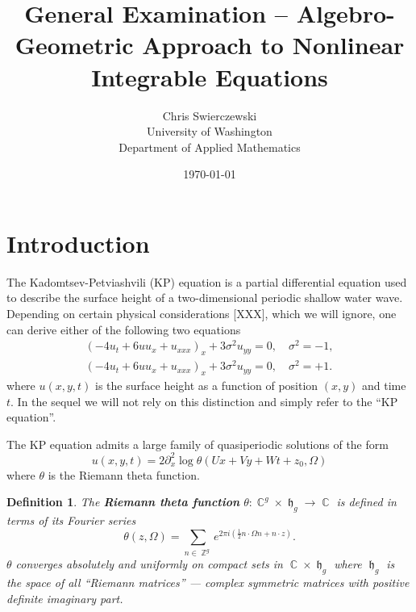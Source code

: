\documentclass[10pt,twoside]{article}
\title{General Examination -- Algebro-Geometric
  Approach to Nonlinear Integrable Equations}
\author{
Chris Swierczewski\\
University of Washington\\
Department of Applied Mathematics}
\date{\today}
\newtheorem{definition}{Definition}[section]
\numberwithin{equation}{section}
\DeclareMathOperator{\ZZ}{\mathbb{Z}}
\DeclareMathOperator{\CC}{\mathbb{C}}
\DeclareMathOperator{\hh}{\mathfrak{h}}
\let\oldmarginpar\marginpar
\renewcommand\marginpar[1]{\oldmarginpar[\scriptsize #1]{\scriptsize #1}}
\begin{document}

\maketitle

\section{Introduction}

The Kadomtsev-Petviashvili (KP) equation is a partial differential
equation used to describe the surface height of a two-dimensional
periodic shallow water wave. Depending on certain physical
considerations [XXX], which we will ignore, one can derive either of the
following two equations
\begin{align}
  \left(-4u_t + 6uu_x + u_{xxx}\right)_x + 3\sigma^2 u_{yy} = 0, \quad
  \sigma^2 = -1, \label{eqn: KP1} \\
  \left(-4u_t + 6uu_x + u_{xxx}\right)_x + 3\sigma^2 u_{yy} = 0, \quad
  \sigma^2 = +1. \label{eqn: KP2}
\end{align}
where $u(x,y,t)$ is the surface height as a function of position $(x,y)$
and time $t$. In the sequel we will not rely on this distinction and
simply refer to the ``KP equation''.


The KP equation admits a large family of quasiperiodic solutions of the
form
\begin{equation} \label{eqn: kpsol}
  u(x,y,t) = 2 \partial_x^2 \log \theta(Ux+Vy+Wt+z_0, \Omega)
\end{equation}
where $\theta$ is the Riemann theta function.

\begin{definition} \label{def: riemanntheta}
  The {\bf Riemann theta function} $\theta: \CC^g \times \hh_g \to \CC$
  is defined in terms of its Fourier series
  \begin{equation} \label{eqn: riemanntheta}
    \theta(z,\Omega) = \sum_{n \in \ZZ^g}
    e^{2 \pi i \left( \tfrac{1}{2} n \cdot \Omega n + n \cdot z \right)}.
  \end{equation}
  $\theta$ converges absolutely and uniformly on compact sets in $\CC
  \times \hh_g$ where $\hh_g$ is the space of all {\it ``Riemann
    matrices''} --- complex symmetric matrices with positive definite
  imaginary part.
\end{definition}
\end{document}
